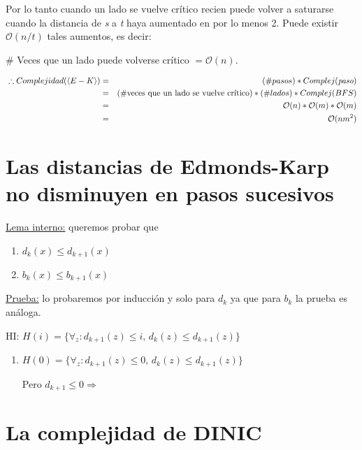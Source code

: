 \documentclass[12pt,a4paper]{report}
\begin{document}
		Por lo tanto cuando un lado se vuelve crítico recien puede volver a saturarse cuando la distancia de \textit{s} a \textit{t} haya aumentado en por lo menos 2. Puede existir $\mathcal{O}(n/t)$ tales aumentos, es decir:
		
		\begin{center}
			\# Veces que un lado puede volverse crítico $= \mathcal{O}(n)$. 
		\end{center}				
		
		\begin{eqnarray}
			 \nonumber \; \therefore Complejidad(\langle E-K \rangle) &=& (\# pasos) * Complej(\textit{paso}) \\
			 \nonumber &=& (\# \textup{veces que un lado se vuelve crítico}) * (\# lados) * Complej(BFS) \\
			\nonumber  &=& \mathcal{O}(n) * \mathcal{O}(m)* \mathcal{O}(m) \\
			\nonumber &=& \mathcal{O}(nm^{2})
		\end{eqnarray}
			
		
	\section{Las distancias de Edmonds-Karp no disminuyen en pasos sucesivos}
		\underline{Lema interno:} queremos probar que
		\begin{enumerate}
			\item $d_{k}(x) \leq d_{k+1}(x)$
			\item $b_{k}(x) \leq b_{k+1}(x)$
		\end{enumerate}
		
		\underline{Prueba:} lo probaremos por inducción y solo para $d_{k}$ ya que para $b_{k}$ la prueba es análoga.
		
		\begin{center}
			HI: $H(i) = \lbrace\forall_{z}: d_{k+1}(z) \leq \textit{i}, \, d_{k}(z) \leq d_{k+1}(z)  \rbrace$
		\end{center}
		
		\begin{enumerate}
			\item $H(0) = \lbrace\forall_{z}: d_{k+1}(z) \leq 0, \, d_{k}(z) \leq d_{k+1}(z)  \rbrace$
			
			Pero $d_{k+1} \leq 0 \Rightarrow $
		\end{enumerate}
	
	\section{La complejidad de DINIC}
\end{document}
